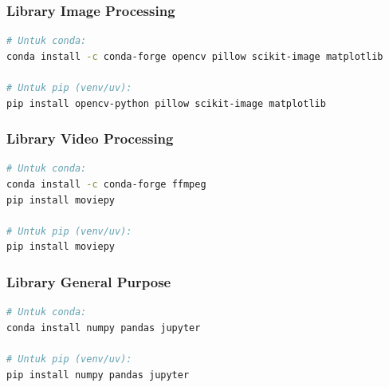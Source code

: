 \documentclass[11pt,a4paper]{article}
\begin{document}
\subsubsection{Library Image Processing}
\begin{lstlisting}[language=bash, caption=Instalasi library image]
# Untuk conda:
conda install -c conda-forge opencv pillow scikit-image matplotlib

# Untuk pip (venv/uv):
pip install opencv-python pillow scikit-image matplotlib
\end{lstlisting}

\subsubsection{Library Video Processing}
\begin{lstlisting}[language=bash, caption=Instalasi library video]
# Untuk conda:
conda install -c conda-forge ffmpeg
pip install moviepy

# Untuk pip (venv/uv):
pip install moviepy
\end{lstlisting}

\subsubsection{Library General Purpose}
\begin{lstlisting}[language=bash, caption=Instalasi library umum]
# Untuk conda:
conda install numpy pandas jupyter

# Untuk pip (venv/uv):
pip install numpy pandas jupyter
\end{lstlisting}
\end{document}
